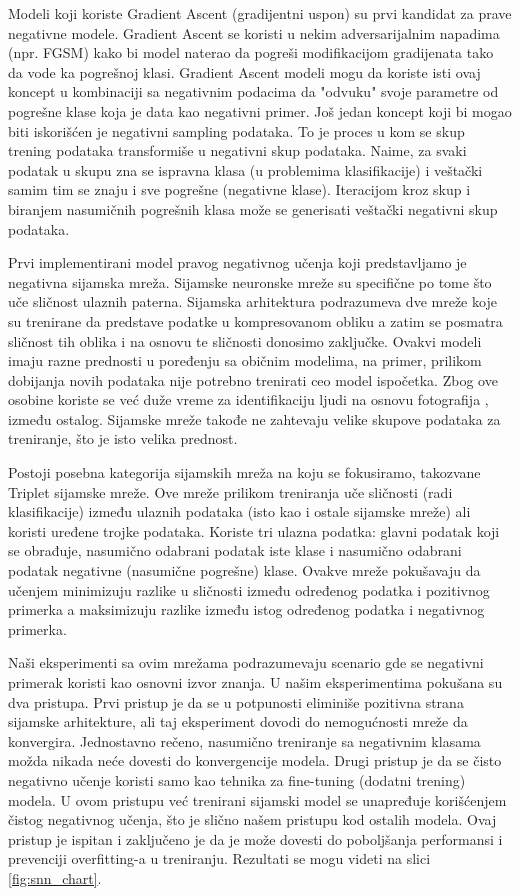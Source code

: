 Modeli koji koriste Gradient Ascent (gradijentni uspon) su prvi kandidat za prave negativne modele. Gradient Ascent se koristi u nekim adversarijalnim napadima (npr. FGSM) kako bi model naterao da pogreši modifikacijom gradijenata tako da vode ka pogrešnoj klasi. Gradient Ascent modeli mogu da koriste isti ovaj koncept u kombinaciji sa negativnim podacima da "odvuku" svoje parametre od pogrešne klase koja je data kao negativni primer. Još jedan koncept koji bi mogao biti iskorišćen je negativni sampling podataka. To je proces u kom se skup trening podataka transformiše u negativni skup podataka. Naime, za svaki podatak u skupu zna se ispravna klasa (u problemima klasifikacije) i veštački samim tim se znaju i sve pogrešne (negativne klase). Iteracijom kroz skup i biranjem nasumičnih pogrešnih klasa može se generisati veštački negativni skup podataka.

Prvi implementirani model pravog negativnog učenja koji predstavljamo je negativna sijamska mreža. Sijamske neuronske mreže \cite{koch2015siamese} su specifične po tome što uče sličnost ulaznih paterna. Sijamska arhitektura podrazumeva dve mreže koje su trenirane da predstave podatke u kompresovanom obliku a zatim se posmatra sličnost tih oblika i na osnovu te sličnosti donosimo zaključke. Ovakvi modeli imaju razne prednosti u poređenju sa običnim modelima, na primer, prilikom dobijanja novih podataka nije potrebno trenirati ceo model ispočetka. Zbog ove osobine koriste se već duže vreme za identifikaciju ljudi na osnovu fotografija \cite{varior2016gated}, između ostalog. Sijamske mreže takođe ne zahtevaju velike skupove podataka za treniranje, što je isto velika prednost.

Postoji posebna kategorija sijamskih mreža na koju se fokusiramo, takozvane Triplet sijamske mreže. Ove mreže prilikom treniranja uče sličnosti (radi klasifikacije) između ulaznih podataka (isto kao i ostale sijamske mreže) ali koristi uređene trojke podataka. Koriste tri ulazna podatka: glavni podatak koji se obrađuje, nasumično odabrani podatak iste klase i nasumično odabrani podatak negativne (nasumične pogrešne) klase. Ovakve mreže pokušavaju da učenjem minimizuju razlike u sličnosti između određenog podatka i pozitivnog primerka a maksimizuju razlike između istog određenog podatka i negativnog primerka. 

Naši eksperimenti sa ovim mrežama podrazumevaju scenario gde se negativni primerak koristi kao osnovni izvor znanja. U našim eksperimentima pokušana su dva pristupa. Prvi pristup je da se u potpunosti eliminiše pozitivna strana sijamske arhitekture, ali taj eksperiment dovodi do nemogućnosti mreže da konvergira. Jednostavno rečeno, nasumično treniranje sa negativnim klasama možda nikada neće dovesti do konvergencije modela. Drugi pristup je da se čisto negativno učenje koristi samo kao tehnika za fine-tuning (dodatni trening) modela. U ovom pristupu već trenirani sijamski model se unapređuje korišćenjem čistog negativnog učenja, što je slično našem pristupu kod ostalih modela. Ovaj pristup je ispitan i zaključeno je da je može dovesti do poboljšanja performansi i prevenciji overfitting-a u treniranju. Rezultati se mogu videti na slici \ref{fig:snn_chart}.

